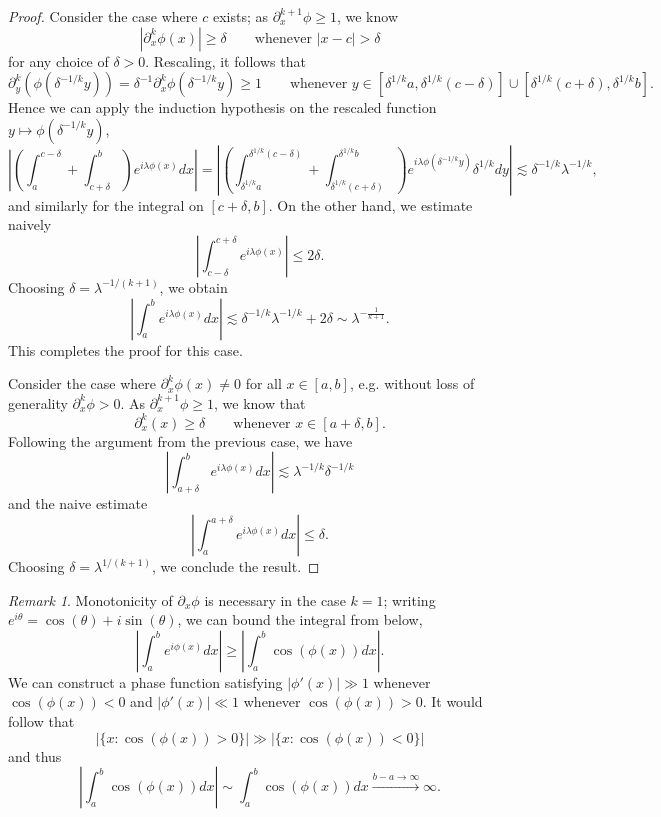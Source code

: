 \documentclass[reqno]{amsart}
\theoremstyle{definition}
\theoremstyle{remark}
\newtheorem*{remark}{Remark}
\begin{document}
\begin{proof}
Consider the case where $c$ exists; as $\partial_x^{k + 1}\phi \geq 1$, we know 
	\[ |\partial_x^{k}\phi (x)| \geq \delta \qquad \text{whenever } |x - c| > \delta \]
for any choice of $\delta > 0$. Rescaling, it follows that
	\[  \partial_y^k (\phi(\delta^{-1/k}y)) = \delta^{-1} \partial_x^k \phi (\delta^{-1/k} y) \geq 1 \qquad \text{whenever } y \in [\delta^{1/k} a, \delta^{1/k} (c - \delta)] \cup [\delta^{1/k} (c + \delta), \delta^{1/k} b]. \]
Hence we can apply the induction hypothesis on the rescaled function $y \mapsto \phi(\delta^{-1/k} y)$,
	\[ \left| \left( \int_a^{c - \delta} + \int_{c + \delta}^b \right) e^{i \lambda \phi(x)} dx \right| = \left| \left( \int_{\delta^{1/k}a}^{\delta^{1/k}(c - \delta)} +\int_{\delta^{1/k}(c + \delta)}^{\delta^{1/k}b} \right) e^{i \lambda \phi(\delta^{-1/k}y)} \delta^{1/k} dy \right| \lesssim \delta^{-1/k} \lambda^{-1/k}, \]
and similarly for the integral on $[c + \delta, b]$. On the other hand, we estimate naively 
	\[ \left| \int_{c - \delta}^{c + \delta} e^{i \lambda \phi(x)} \right| \leq 2 \delta. \]
Choosing $\delta = \lambda^{-1/(k + 1)}$, we obtain
	\[ \left| \int_a^b e^{i \lambda \phi(x)}  dx \right| \lesssim \delta^{-1/k} \lambda^{-1/k} + 2 \delta \sim \lambda^{- \frac{1}{k + 1}}. \]	
This completes the proof for this case. 	

Consider the case where $\partial_x^k \phi (x) \neq 0$	for all $x \in [a, b]$, e.g. without loss of generality $\partial_x^k \phi > 0$. As $\partial_x^{k + 1} \phi \geq 1$, we know that 
	\[ \partial_x^k (x) \geq \delta \qquad \text{whenever } x \in [a + \delta, b]. \]
Following the argument from the previous case, we have
	\[ \left| \int_{a + \delta}^b e^{i \lambda \phi(x)} dx \right|  \lesssim \lambda^{-1/k} \delta^{-1/k}\]
and the naive estimate
	\[ \left| \int_a^{a + \delta} e^{i \lambda \phi(x)} dx \right| \leq \delta. \]	
Choosing $\delta = \lambda^{1/(k + 1)}$, we conclude the result. 	
\end{proof}

\begin{remark}
	Monotonicity of $\partial_x \phi$ is necessary in the case $k = 1$; writing $e^{i \theta} = \cos (\theta) + i \sin (\theta)$, we can bound the integral from below,  
		\[ \left| \int_a^b e^{i \phi(x)} dx \right| \geq \left| \int_a^b \cos(\phi(x)) dx \right|. \]
	We can construct a phase function satisfying $|\phi' (x)| \gg 1$ whenever $\cos(\phi(x)) < 0$ and $|\phi'(x)| \ll 1$ whenever $\cos(\phi(x)) > 0$. It would follow that 
		\[ |\{ x : \cos(\phi(x)) > 0\}| \gg |\{ x : \cos (\phi(x)) < 0 \}| \]
	and thus
		\[ \left| \int_a^b \cos(\phi(x)) dx \right| \sim \int_a^b \cos(\phi(x)) dx \overset{b - a \to \infty}{\longrightarrow} \infty. \]	
\end{remark}
\end{document}
